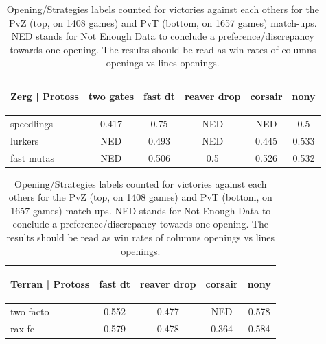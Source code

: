 \begin{table}[h] 
\begin{center}
\begin{small}
\begin{tabular}{|l|ccccc|}
\hline
\begin{tiny}Zerg | Protoss\end{tiny} & two gates & fast dt & reaver drop & corsair & nony\\
\hline
speedlings &  0.417& 0.75 & NED & NED & 0.5 \\
lurkers &  NED & 0.493& NED & 0.445 & 0.533\\
fast mutas &  NED & 0.506& 0.5 & 0.526& 0.532\\
\hline
\end{tabular}
\begin{tabular}{|l|cccc|}
\hline
\begin{tiny}Terran | Protoss\end{tiny} & fast dt & reaver drop & corsair & nony\\
\hline
two facto &  0.552& 0.477& NED & 0.578\\
rax fe &  0.579& 0.478& 0.364& 0.584\\
\hline
\end{tabular}
\end{small}
\caption{Opening/Strategies labels counted for victories against each others for the PvZ (top, on 1408 games) and PvT (bottom, on 1657 games) match-ups. NED stands for Not Enough Data to conclude a preference/discrepancy towards one opening. The results should be read as win rates of columns openings vs lines openings.}
\end{center}
\label{table:openingcontingency}
\end{table}

